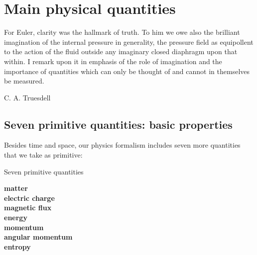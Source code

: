 \documentclass[a4paper,12pt,%
onecolumn,oneside,%
british%
]{memoir}
\renewcommand*{\|}[1][]{\nonscript\:#1\vert\nonscript\:\mathopen{}}
\begin{document}
%
%
%
%





\printpagenotes*
\clearpage
\chapter{Main physical quantities}
\label{cha:stuff}

\epigraph{For Euler, clarity was the hallmark of truth. \textelp{} To him we owe also the brilliant imagination of the internal pressure in generality, the pressure field as equipollent to the action of the fluid outside any imaginary closed diaphragm upon that within. \textelp{} I remark upon it in emphasis of the role of imagination and the importance of quantities which can only be thought of and cannot in themselves be measured.}{C. A. Truesdell \cites*{truesdell1956d}}



\section[Seven primitive quantities]{Seven primitive quantities: basic properties}
\label{sec:stuff}

Besides time and space, our physics formalism includes seven more quantities that we take as primitive:
\begin{definition}{Seven primitive quantities}
  \begin{center}\bfseries
    matter
    \\ electric charge
    \\ magnetic flux
    \\ energy
    \\ momentum
    \\ angular momentum
    \\ entropy
  \end{center}
\end{definition}
\end{document}
